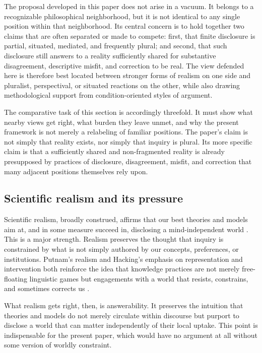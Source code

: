 \documentclass[11pt]{article}
\begin{document}
The proposal developed in this paper does not arise in a vacuum. It belongs to a recognizable philosophical neighborhood, but it is not identical to any single position within that neighborhood. Its central concern is to hold together two claims that are often separated or made to compete: first, that finite disclosure is partial, situated, mediated, and frequently plural; and second, that such disclosure still answers to a reality sufficiently shared for substantive disagreement, descriptive misfit, and correction to be real. The view defended here is therefore best located between stronger forms of realism on one side and pluralist, perspectival, or situated reactions on the other, while also drawing methodological support from condition-oriented styles of argument.

The comparative task of this section is accordingly threefold. It must show what nearby views get right, what burden they leave unmet, and why the present framework is not merely a relabeling of familiar positions. The paper's claim is not simply that reality exists, nor simply that inquiry is plural. Its more specific claim is that a sufficiently shared and non-fragmented reality is already presupposed by practices of disclosure, disagreement, misfit, and correction that many adjacent positions themselves rely upon.

\subsection{Scientific realism and its pressure}

Scientific realism, broadly construed, affirms that our best theories and models aim at, and in some measure succeed in, disclosing a mind-independent world \cite{Chakravartty2011ScientificRealismSEP}. This is a major strength. Realism preserves the thought that inquiry is constrained by what is not simply authored by our concepts, preferences, or institutions. Putnam's realism and Hacking's emphasis on representation and intervention both reinforce the idea that knowledge practices are not merely free-floating linguistic games but engagements with a world that resists, constrains, and sometimes corrects us \cite{Putnam1983RealismReason,Hacking1983RepresentingIntervening}.

What realism gets right, then, is answerability. It preserves the intuition that theories and models do not merely circulate within discourse but purport to disclose a world that can matter independently of their local uptake. This point is indispensable for the present paper, which would have no argument at all without some version of worldly constraint.
\end{document}
